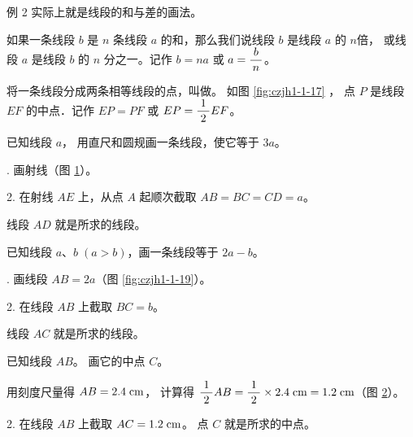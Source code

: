 例 2 实际上就是线段的和与差的画法。

\begin{enhancedline}
如果一条线段 $b$ 是 $n$ 条线段 $a$ 的和，那么我们说线段 $b$ 是线段 $a$ 的 $n$倍，
或线段 $a$ 是线段 $b$ 的 $n$ 分之一。记作 $b = na$ 或 $a = \dfrac{\; b \;}{n}$。

将一条线段分成两条相等线段的点，叫做。
如图 \ref{fig:czjh1-1-17} ， 点 $P$ 是线段 $EF$ 的中点．记作 $EP = PF$ 或 $EP = \dfrac{\; 1 \;}{2}EF$。
\end{enhancedline}

\begin{figure}[htbp]
    \centering
    \begin{minipage}[b]{7cm}
        \centering
        
        \caption{}\label{fig:czjh1-1-17}
    \end{minipage}
    \qquad
    \begin{minipage}[b]{7cm}
        \centering
        
        \caption{}\label{fig:czjh1-1-18}
    \end{minipage}
\end{figure}


\liti 已知线段 $a$， 用直尺和圆规画一条线段，使它等于 $3a$。

. 画射线（图 \ref{fig:czjh1-1-18}）。

2. 在射线 $AE$ 上，从点 $A$ 起顺次截取 $AB = BC = CD = a$。

线段 $AD$ 就是所求的线段。


\liti 已知线段 $a$、$b\; (a > b)$，画一条线段等于 $2a - b$。

. 画线段 $AB = 2a$（图 \ref{fig:czjh1-1-19}）。

2. 在线段 $AB$ 上截取 $BC = b$。

线段 $AC$ 就是所求的线段。

\begin{figure}[htbp]
    \centering
    \begin{minipage}[b]{7cm}
        \centering
        
        \caption{}\label{fig:czjh1-1-19}
    \end{minipage}
    \qquad
    \begin{minipage}[b]{7cm}
        \centering
        
        \caption{}\label{fig:czjh1-1-20}
    \end{minipage}
\end{figure}

\begin{enhancedline}
\liti 已知线段 $AB$。 画它的中点 $C$。

\huafa 用刻度尺量得 $AB = 2.4 \; \mathord{\text{cm}}$， 计算得 $\dfrac{\; 1 \;}{2} AB = \dfrac{\; 1 \;}{2} \times 2.4 \; \mathord{\text{cm}} = 1.2 \; \mathord{\text{cm}}$（图 \ref{fig:czjh1-1-20}）。

2. 在线段 $AB$ 上截取 $AC= 1.2\;\mathord{\text{cm}}$。 点 $C$ 就是所求的中点。
\end{enhancedline}


